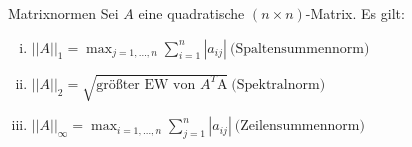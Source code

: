 \begin{flashcard}[Satz]{Matrixnormen}
Sei $A$ eine quadratische $(n \times n)$-Matrix. Es gilt:
\begin{enumerate}[(i)]
	\item $\displaystyle ||A||_1 = \max_{j=1,\ldots,n} \sum_{i=1}^n |a_{ij}| \ \text{(Spaltensummennorm)}$
	\item $\displaystyle ||A||_2 = \sqrt{\text{größter EW von $A^T$A}} \ \text{(Spektralnorm)}$
	\item $\displaystyle ||A||_\infty = \max_{i=1,\ldots,n} \sum_{j=1}^n |a_{ij}| \ \text{(Zeilensummennorm)}$
\end{enumerate}
\end{flashcard}